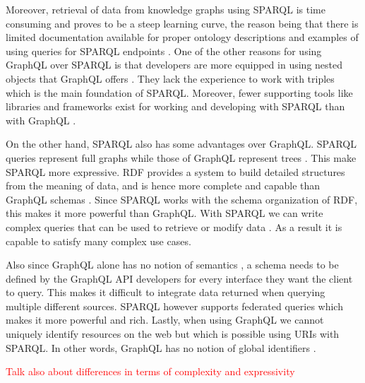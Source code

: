 Moreover, retrieval of data from knowledge graphs using SPARQL is time consuming and proves to be a steep learning curve, the reason being that there is limited documentation available for proper ontology descriptions and examples of using queries for SPARQL endpoints \cite{Angele2022}. One of the other reasons for using GraphQL over SPARQL is that developers are more equipped in using nested objects that GraphQL offers \cite{Taelman2018}. They lack the experience to work with triples which is the main foundation of SPARQL. Moreover, fewer supporting tools like libraries and frameworks exist for working and developing with SPARQL than with GraphQL \cite{Taelman2018}. 

On the other hand, SPARQL also has some advantages over GraphQL. SPARQL queries represent full graphs while those of GraphQL represent trees \cite{Taelman2018}. This make SPARQL more expressive. RDF provides a system to build detailed structures from the meaning of data, and is hence more complete and capable than GraphQL schemas \cite{Dresslar2019}. Since SPARQL works with the schema organization of RDF, this makes it more powerful than GraphQL. With SPARQL we can write complex queries that can be used to retrieve or modify data \cite{Angele2022}. As a result it is capable to satisfy many complex use cases.

Also since GraphQL alone has no notion of semantics \cite{Taelman2018}, a schema needs to be defined by the GraphQL API developers for every interface they want the client to query. This makes it difficult to integrate data returned when querying multiple different sources. SPARQL however supports federated queries which makes it more powerful and rich. Lastly, when using GraphQL we cannot uniquely identify resources on the web but which is possible using URIs with SPARQL. In other words, GraphQL has no notion of global identifiers \cite{Taelman2018}.

\textcolor{red}{Talk also about differences in terms of complexity and expressivity}
